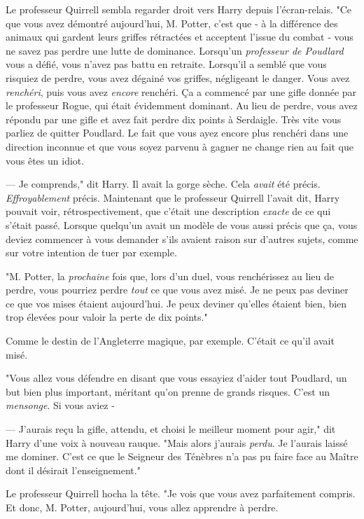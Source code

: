 Le professeur Quirrell sembla regarder droit vers Harry depuis l'écran-relais. "Ce que vous avez démontré aujourd'hui, M. Potter, c'est que - à la différence des animaux qui gardent leurs griffes rétractées et acceptent l'issue du combat - vous ne savez pas perdre une lutte de dominance. Lorsqu'un \emph{professeur de Poudlard} vous a défié, vous n'avez pas battu en retraite. Lorsqu'il a semblé que vous risquiez de perdre, vous avez dégainé vos griffes, négligeant le danger. Vous avez \emph{renchéri}, puis vous avez \emph{encore} renchéri. Ça a commencé par une gifle donnée par le professeur Rogue, qui était évidemment dominant. Au lieu de perdre, vous avez répondu par une gifle et avez fait perdre dix points à Serdaigle. Très vite vous parliez de quitter Poudlard. Le fait que vous ayez encore plus renchéri dans une direction inconnue et que vous soyez parvenu à gagner ne change rien au fait que vous êtes un idiot.

--- Je comprends," dit Harry. Il avait la gorge sèche. Cela \emph{avait} été précis. \emph{Effroyablement} précis. Maintenant que le professeur Quirrell l'avait dit, Harry pouvait voir, rétrospectivement, que c'était une description \emph{exacte} de ce qui s'était passé. Lorsque quelqu'un avait un modèle de vous aussi précis que ça, vous deviez commencer à vous demander s'ils avaient raison sur d'autres sujets, comme sur votre intention de tuer par exemple.

"M. Potter, la \emph{prochaine} fois que, lors d'un duel, vous renchérissez au lieu de perdre, vous pourriez perdre \emph{tout} ce que vous avez misé. Je ne peux pas deviner ce que vos mises étaient aujourd'hui. Je peux deviner qu'elles étaient bien, bien trop élevées pour valoir la perte de dix points."

Comme le destin de l'Angleterre magique, par exemple. C'était ce qu'il avait misé.

"Vous allez vous défendre en disant que vous essayiez d'aider tout Poudlard, un but bien plus important, méritant qu'on prenne de grands risques. C'est un \emph{mensonge}. Si vous aviez -

--- J'aurais reçu la gifle, attendu, et choisi le meilleur moment pour agir," dit Harry d'une voix à nouveau rauque. "Mais alors j'aurais \emph{perdu}. Je l'aurais laissé me dominer. C'est ce que le Seigneur des Ténèbres n'a pas pu faire face au Maître dont il désirait l'enseignement."

Le professeur Quirrell hocha la tête. "Je vois que vous avez parfaitement compris. Et donc, M. Potter, aujourd'hui, vous allez apprendre à perdre.

